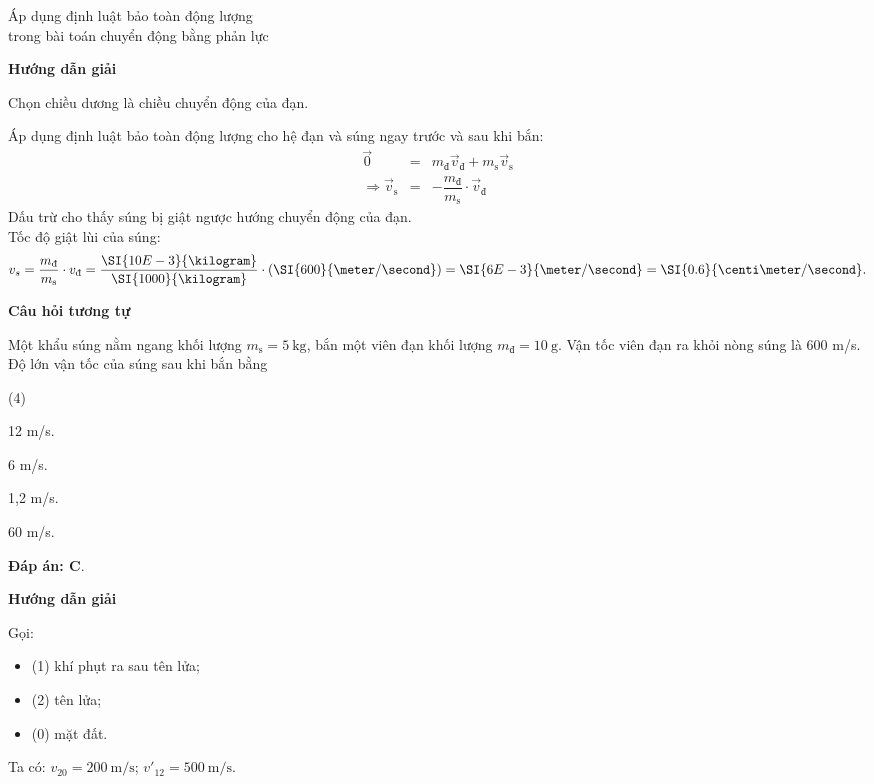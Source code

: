 \begin{dang}{Áp dụng định luật bảo toàn động lượng \\trong bài toán chuyển động bằng phản lực}
	{	\begin{center}
			\textbf{Hướng dẫn giải}
		\end{center}
		Chọn chiều dương là chiều chuyển động của đạn. 
		
		Áp dụng định luật bảo toàn động lượng cho hệ đạn và súng ngay trước và sau khi bắn:
		\begin{eqnarray*}
			\vec{0}&=&m_\text{đ}\vec v_\text{đ}+m_\text{s}\vec v_\text{s}\\
			\Rightarrow \vec v_\text{s}&=&-\dfrac{m_\text{đ}}{m_\text{s}}\cdot\vec v_\text{đ}
		\end{eqnarray*}
		Dấu trừ cho thấy súng bị giật ngược hướng chuyển động của đạn.\\
		Tốc độ giật lùi của súng:
		$$v_s=\dfrac{m_\text{đ}}{m_\text{s}}\cdot v_\text{đ}=\dfrac{\SI{10E-3}{\kilogram}}{\SI{1000}{\kilogram}}\cdot\left(\SI{600}{\meter/\second}\right)=\SI{6E-3}{\meter/\second}=\SI{0.6}{\centi\meter/\second}.$$
		
		
		\begin{center}
			\textbf{Câu hỏi tương tự}
		\end{center}
		
		Một khẩu súng nằm ngang khối lượng $m_\text{s} = 5\ \text{kg}$, bắn một viên đạn khối lượng $m_\text{đ} = 10\ \text{g}$. Vận tốc viên đạn ra khỏi nòng súng là 600 m/s. Độ lớn vận tốc của súng sau khi bắn bằng
		\begin{mcq}(4)
			\item 12 m/s.	
			\item 6 m/s.
			\item 1,2 m/s.	
			\item 60 m/s.
		\end{mcq}
		
		\textbf{Đáp án: C}.
	}
	{\begin{center}
			\textbf{Hướng dẫn giải}
		\end{center}
	Gọi:
	\begin{itemize}
		\item (1) khí phụt ra sau tên lửa;
		\item (2) tên lửa;
		\item (0) mặt đất.
	\end{itemize}
Ta có: $v_{20}=\SI{200}{\meter/\second}$; $v'_{12}=\SI{500}{\meter/\second}$.
		
}
\end{dang}

